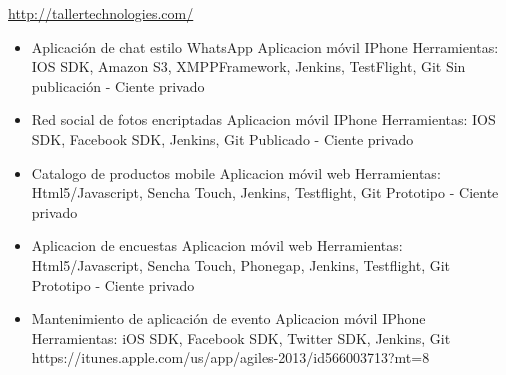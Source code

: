 \documentclass[11pt,a4paper]{moderncv}
\begin{document}
{
    \url{http://tallertechnologies.com/}
    \begin{itemize}
        \item Aplicación de chat estilo WhatsApp
            \newline{}
            Aplicacion móvil IPhone
            \newline{}
            Herramientas: IOS SDK, Amazon S3, XMPPFramework, Jenkins, TestFlight, Git
            \newline{}
            Sin publicación - Ciente privado
            \newline{}
        \item Red social de fotos encriptadas
            \newline{}
            Aplicacion móvil IPhone
            \newline{}
            Herramientas: IOS SDK, Facebook SDK, Jenkins, Git
            \newline{}
            Publicado - Ciente privado
            \newline{}
        \item Catalogo de productos mobile
            \newline{}
            Aplicacion móvil web
            \newline{}
            Herramientas: Html5/Javascript, Sencha Touch, Jenkins, Testflight, Git
            \newline{}
            Prototipo - Ciente privado
            \newline{}
        \item Aplicacion de encuestas
            \newline{}
            Aplicacion móvil web
            \newline{}
            Herramientas: Html5/Javascript, Sencha Touch, Phonegap, Jenkins, Testflight, Git
            \newline{}
            Prototipo - Ciente privado
            \newline{}
        \item Mantenimiento de aplicación de evento
            \newline{}
            Aplicacion móvil IPhone
            \newline{}
            Herramientas: iOS SDK, Facebook SDK, Twitter SDK, Jenkins, Git
            \newline{}
            https://itunes.apple.com/us/app/agiles-2013/id566003713?mt=8

\end{itemize}}
\end{document}

